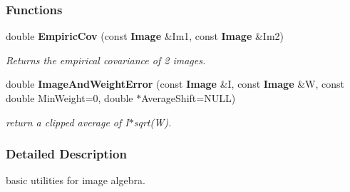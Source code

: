 \subsubsection*{Functions}
\begin{CompactItemize}
\item 
{}
double {\bf Empiric\-Cov} (const {\bf Image} \&Im1, const {\bf Image} \&Im2)\label{image_h_a3}

\begin{CompactList}\small\item\em Returns the empirical covariance of 2 images.\item\end{CompactList}\item 
{}
double {\bf Image\-And\-Weight\-Error} (const {\bf Image} \&I, const {\bf Image} \&W, const double Min\-Weight=0, double $\ast$Average\-Shift=NULL)\label{image_h_a4}

\begin{CompactList}\small\item\em return a clipped average of I$\ast$sqrt(W).\item\end{CompactList}\end{CompactItemize}


\subsubsection{Detailed Description}
basic utilities for image algebra.




